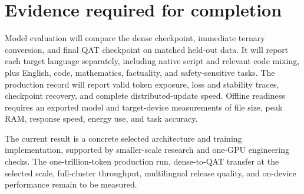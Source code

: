 \documentclass[11pt]{article}
\begin{document}
\section{Evidence required for completion}

Model evaluation will compare the dense checkpoint, immediate ternary
conversion, and final QAT checkpoint on matched held-out data. It will
report each target language separately, including native script and
relevant code mixing, plus English, code, mathematics, factuality, and
safety-sensitive tasks. The production record will report valid token
exposure, loss and stability traces, checkpoint recovery, and complete
distributed-update speed. Offline readiness requires an exported model
and target-device measurements of file size, peak RAM, response speed,
energy use, and task accuracy.

The current result is a concrete selected architecture and training
implementation, supported by smaller-scale research and one-GPU
engineering checks. The one-trillion-token production run, dense-to-QAT
transfer at the selected scale, full-cluster throughput, multilingual
release quality, and on-device performance remain to be measured.
\end{document}
